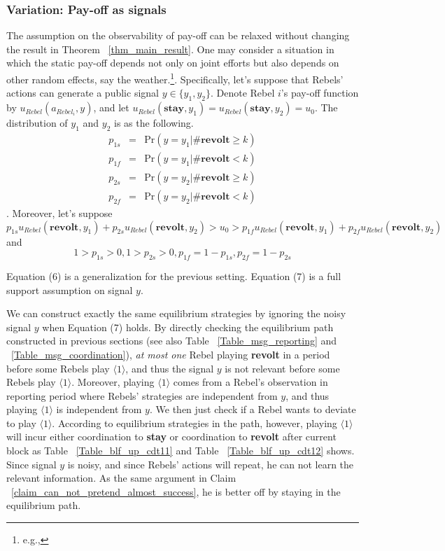 \documentclass[12pt,letterpaper]{article}
\newtheorem*{main result}{Main Result}
\theoremstyle{definition}
\theoremstyle{remark}
\theoremstyle{claim}
\begin{document}
\subsubsection{Variation: Pay-off as signals}
The assumption on the observability of pay-off can be relaxed without changing the result in Theorem ~\ref{thm_main_result}. One may consider a situation in which the static pay-off depends not only on joint efforts but also depends on other random effects, say the weather.\footnote{e.g.,\citep{SHADMEHR2011}}. Specifically, let's suppose that Rebels' actions can generate a public signal $y\in \{y_1,y_2\}$. Denote Rebel $i$'s pay-off function by $u_{Rebel}(a_{Rebel_i},y)$, and let $u_{Rebel}(\textbf{stay},y_1)=u_{Rebel}(\textbf{stay},y_2)=u_0$. The distribution of $y_1$ and $y_2$ is as the following.
\begin{eqnarray*}
p_{1s} &=& \mathrm {Pr}(y=y_1|\#\textbf{revolt}\geq k) \\
p_{1f} &=& \mathrm {Pr}(y=y_1|\#\textbf{revolt}< k) \\
p_{2s} &=& \mathrm {Pr}(y=y_2|\#\textbf{revolt}\geq k) \\
p_{2f} &=& \mathrm {Pr}(y=y_2|\#\textbf{revolt}< k) 
\end{eqnarray*}
. Moreover, let's suppose
\begin{equation}
p_{1s}u_{Rebel}(\textbf{revolt}, y_1)+p_{2s}u_{Rebel}(\textbf{revolt}, y_2)>u_0>p_{1f}u_{Rebel}(\textbf{revolt}, y_1)+p_{2f}u_{Rebel}(\textbf{revolt}, y_2)
\end{equation}
and
\begin{equation}
1>p_{1s}>0,1>p_{2s}>0,p_{1f}=1-p_{1s},p_{2f}=1-p_{2s}
\end{equation}

Equation (6) is a generalization for the previous setting. Equation (7) is a full support assumption on signal $y$. 

We can construct exactly the same equilibrium strategies by ignoring the noisy signal $y$ when Equation (7) holds. By directly checking the equilibrium path constructed in previous sections (see also Table ~\ref{Table_msg_reporting} and ~\ref{Table_msg_coordination}), \textit{at most one} Rebel playing \textbf{revolt} in a period before some Rebels play $\langle 1 \rangle$, and thus the signal $y$ is not relevant before some Rebels play $\langle 1 \rangle$. Moreover, playing $\langle 1 \rangle$ comes from a Rebel's observation in reporting period where Rebels' strategies are independent from $y$, and thus playing $\langle 1 \rangle$ is independent from $y$. We then just check if a Rebel wants to deviate to play $\langle 1 \rangle$. According to equilibrium strategies in the path, however, playing $\langle 1 \rangle$ will incur either coordination to \textbf{stay} or coordination to \textbf{revolt} after current block as Table ~\ref{Table_blf_up_cdt11} and Table ~\ref{Table_blf_up_cdt12} shows. Since signal $y$ is noisy, and since Rebels' actions will repeat, he can not learn the relevant information. As the same argument in Claim ~\ref{claim_can_not_pretend_almost_success}, he is better off by staying in the equilibrium path.
\end{document}
